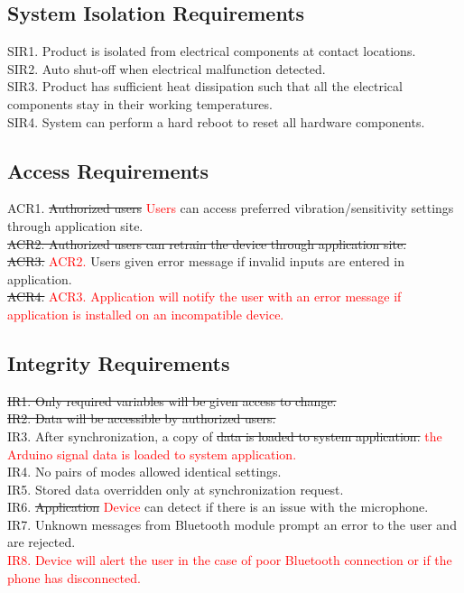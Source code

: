 \documentclass[12pt, titlepage]{article}
\begin{document}
\subsection{System Isolation Requirements}

SIR1. Product is isolated from electrical components at contact locations.
\\SIR2. Auto shut-off when electrical malfunction detected. 
\\SIR3. Product has sufficient heat dissipation such that all the electrical components stay in their working temperatures.
\\SIR4. System can perform a hard reboot to reset all hardware components.


\subsection{Access Requirements}

ACR1. \sout{Authorized users} \textcolor{red}{Users} can access preferred vibration/sensitivity settings through application site.
\sout{\\ACR2. Authorized users can retrain the device through application site.}
\\\sout{ACR3.} \textcolor{red}{ACR2.} Users given error message if invalid inputs are entered in application.
\\\sout{ACR4.} \textcolor{red}{ACR3. Application will notify the user with an error message if application is installed on an incompatible device.}

\subsection{Integrity Requirements}

\sout {IR1. Only required variables will be given access to change.}
\sout{\\IR2. Data will be accessible by \sout{authorized} users.}
\\ IR3. After synchronization, a copy of \sout{data is loaded to system application.} \textcolor{red}{the Arduino signal data is loaded to system application.}
\\IR4. No pairs of modes allowed identical settings.
\\IR5. Stored data overridden only at synchronization request.
\\IR6. \sout{Application} \textcolor{red}{Device} can detect if there is an issue with the microphone.
\\IR7. Unknown messages from Bluetooth module prompt an error to the user and are rejected.
\\\textcolor{red}{IR8. Device will alert the user in the case of poor Bluetooth connection or if the phone has disconnected.}
\end{document}
